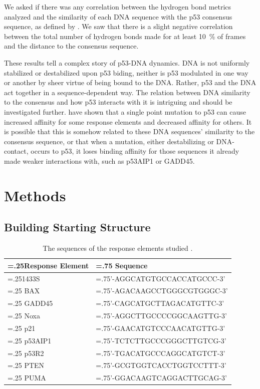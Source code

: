 We asked if there was any correlation between the hydrogen bond metrics analyzed and the similarity of each DNA sequence with the p53 consensus sequence, as defined by \parencite{el-deiryDefinitionConsensusBinding1992}. We saw that there is a slight negative correlation between the total number of hydrogen bonds made for at least \qty{10}{\percent} of frames and the distance to the consensus sequence.

These results tell a complex story of p53-DNA dynamics. DNA is not uniformly stabilized or destabilized upon p53 biding, neither is p53 modulated in one way or another by sheer virtue of being bound to the DNA. Rather, p53 and the DNA act together in a sequence-dependent way. The relation between DNA similarity to the consensus and how p53 interacts with it is intriguing and should be investigated further. \textcite{ingaP53MutantsExhibiting2001b} have shown that a single point mutation to p53 can cause increased affinity for some response elements and decreased affinity for others. It is possible that this is somehow related to these DNA sequences' similarity to the consensus sequence, or that when a mutation, either destabilizing or DNA-contact, occurs to p53, it loses binding affinity for those sequences it already made weaker interactions with, such as p53AIP1 or GADD45.

\section{Methods}

\subsection{Building Starting Structure}

\begin{table}[htbp]
\centering
\renewcommand{\arraystretch}{1.2}
{
\begin{tabularx}{\textwidth}{|>{\hsize=.25\hsize}X|>{\hsize=.75\hsize}X|}
\hline
Response Element & Sequence \\
\hline
1433S & 5'-AGGCATGTGCCACCATGCCC-3' \\
\hline
BAX & 5'-AGACAAGCCTGGGCGTGGGC-3' \\
\hline
GADD45 & 5'-CAGCATGCTTAGACATGTTC-3' \\
\hline
Noxa & 5'-AGGCTTGCCCCGGCAAGTTG-3' \\
\hline
p21 & 5'-GAACATGTCCCAACATGTTG-3' \\
\hline
p53AIP1 & 5'-TCTCTTGCCCGGGCTTGTCG-3' \\
\hline
p53R2 & 5'-TGACATGCCCAGGCATGTCT-3' \\
\hline
PTEN & 5'-GCGTGGTCACCTGGTCCTTT-3' \\
\hline
PUMA & 5'-GGACAAGTCAGGACTTGCAG-3' \\
\hline
\end{tabularx}
}
\caption[Response Element Sequence Table]{The sequences of the response elements studied \parencite{katoUnderstandingFunctionStructure2003a, teresiCowdenSyndromeAffected2007, maSequenceAnalysisP532007}.}
\label{tab:re-sequences}
\end{table}

